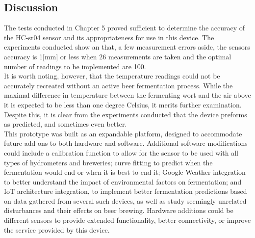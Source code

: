 \documentclass[twoside]{ctuthesis}
\theoremstyle{plain}
\theoremstyle{definition}
\theoremstyle{note}
\begin{document}
\subsection{Discussion}
The tests conducted in Chapter 5 proved sufficient to determine the accuracy of the HC-sr04 sensor and its appropriateness for use in this device.	The experiments conducted show an that, a few measurement errors aside, the sensors accuracy is 1[mm] or less when 26 measurements are taken and the optimal number of readings to be implemented are 100.\\
It is worth noting, however, that the temperature readings could not be accurately recreated without an active beer fermentation process. While the maximal difference in temperature between the fermenting wort and the air above it is expected to be less than one degree Celsius\cite{Thermodynamics_Brewers}, it merits further examination. Despite this, it is clear from the experiments conducted that the device preforms as predicted, and sometimes even better.\\
This prototype was built as an expandable platform, designed to accommodate future add ons to both hardware and software. Additional software modifications could include a calibration function to allow for the sensor to be used with all types of hydrometers and breweries; curve fitting to predict when the fermentation would end or when it is best to end it; Google Weather integration to better understand the impact of environmental factors on fermentation; and IoT architecture integration, to implement better fermentation predictions based on data gathered from several such devices, as well as study seemingly unrelated disturbances and their effects on beer brewing.
Hardware additions could be different sensors to provide extended functionality, better connectivity, or improve the service provided by this device.

\pagebreak
\end{document}
